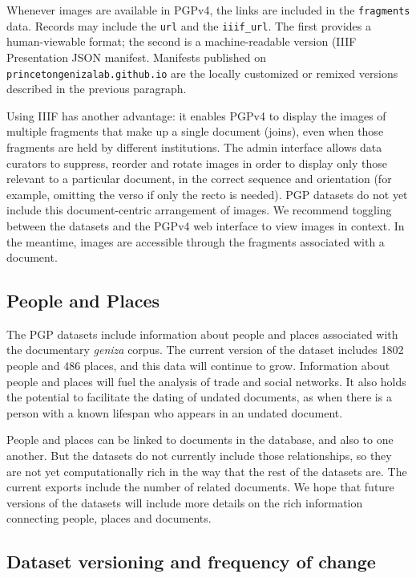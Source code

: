 \documentclass{article}
\def\totalPeopleRecords{1802}
\def\totalPlaceRecords{486}
\begin{document}
Whenever images are available in PGPv4, the links are included in the \texttt{fragments} data. Records may include the \texttt{url} and the \texttt{iiif\_url}. The first provides a human-viewable format; the second is a machine-readable version (IIIF Presentation JSON manifest. Manifests published on
\texttt{princetongenizalab.github.io} are the locally customized or remixed versions described in the previous paragraph.

Using IIIF has another advantage: it enables PGPv4 to display the images of multiple fragments that make up a single document (joins), even when those fragments are held by different institutions. The admin interface allows data curators to suppress, reorder and rotate images in order to display only those relevant to a particular document, in the correct sequence and orientation (for example, omitting the verso if only the recto is needed). PGP datasets do not yet include this document-centric arrangement of images. We recommend toggling between the datasets and the PGPv4 web interface to view images in context. In the meantime, images are accessible through the fragments associated with a document.

\subsection{People and Places}

The PGP datasets include information about people and places associated with the documentary \textit{geniza }corpus. The current version of the dataset includes \totalPeopleRecords\hspace{0.25ex} people and \totalPlaceRecords\hspace{0.25ex} places, and this data will continue to grow. Information about people and places will fuel the analysis of trade and social networks. It also holds the potential to facilitate the dating of undated documents, as when there is a person with a known lifespan who appears in an undated document. 

People and places can be linked to documents in the database, and also to one another. But the datasets do not currently include those relationships, so they are not yet computationally rich in the way that the rest of the datasets are. The current exports include the number of related documents. We hope that future versions of the datasets will include more details on the rich information connecting people, places and documents.

\subsection{Dataset versioning and frequency of change}
\end{document}
